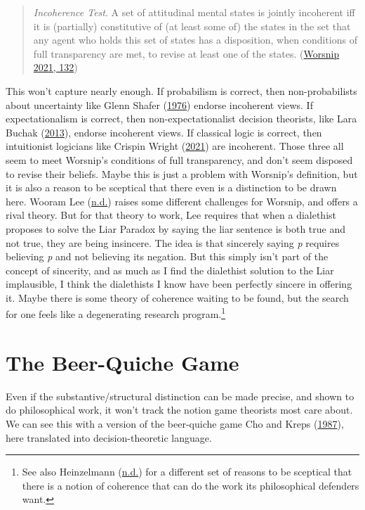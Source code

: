 \documentclass[
  12pt,
  letterpaper,
  DIV=11,
  numbers=noendperiod]{scrreprt}
\begin{document}
\begin{quote}
\emph{Incoherence Test}. A set of attitudinal mental states is jointly
incoherent iff it is (partially) constitutive of (at least some of) the
states in the set that any agent who holds this set of states has a
disposition, when conditions of full transparency are met, to revise at
least one of the states. (\protect\hyperlink{ref-Worsnip2021}{Worsnip
2021, 132})
\end{quote}

This won't capture nearly enough. If probabilism is correct, then
non-probabilists about uncertainty like Glenn Shafer
(\protect\hyperlink{ref-Shafer1976}{1976}) endorse incoherent views. If
expectationalism is correct, then non-expectationalist decision
theorists, like Lara Buchak (\protect\hyperlink{ref-BuchakRisk}{2013}),
endorse incoherent views. If classical logic is correct, then
intuitionist logicians like Crispin Wright
(\protect\hyperlink{ref-WrightVaguenessCollection}{2021}) are
incoherent. Those three all seem to meet Worsnip's conditions of full
transparency, and don't seem disposed to revise their beliefs. Maybe
this is just a problem with Worsnip's definition, but it is also a
reason to be sceptical that there even is a distinction to be drawn
here. Wooram Lee (\protect\hyperlink{ref-Leend}{n.d.}) raises some
different challenges for Worsnip, and offers a rival theory. But for
that theory to work, Lee requires that when a dialethist proposes to
solve the Liar Paradox by saying the liar sentence is both true and not
true, they are being insincere. The idea is that sincerely saying
\emph{p} requires believing \emph{p} and not believing its negation. But
this simply isn't part of the concept of sincerity, and as much as I
find the dialethist solution to the Liar implausible, I think the
dialethists I know have been perfectly sincere in offering it. Maybe
there is some theory of coherence waiting to be found, but the search
for one feels like a degenerating research program.\footnote{See also
  Heinzelmann (\protect\hyperlink{ref-Heinzelmannnd}{n.d.}) for a
  different set of reasons to be sceptical that there is a notion of
  coherence that can do the work its philosophical defenders want.}

\hypertarget{sec-beer-quiche}{%
\section{The Beer-Quiche Game}\label{sec-beer-quiche}}

Even if the substantive/structural distinction can be made precise, and
shown to do philosophical work, it won't track the notion game theorists
most care about. We can see this with a version of the beer-quiche game
Cho and Kreps (\protect\hyperlink{ref-ChoKreps1987}{1987}), here
translated into decision-theoretic language.
\end{document}
